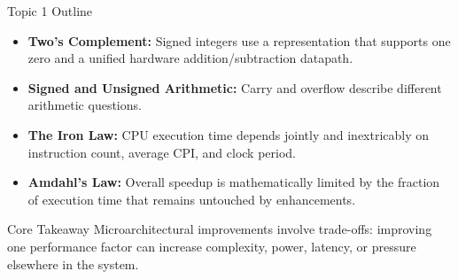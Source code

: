 \documentclass[aspectratio=169,11pt,t]{beamer}
\newcommand{\key}[1]{\textbf{#1}}
\begin{document}
\begin{frame}{Topic 1 Outline}

\begin{itemize}\setlength{\itemsep}{6pt}
  \item \key{Two's Complement:} Signed integers use a representation that supports one zero and a unified hardware addition/subtraction datapath.
  \item \key{Signed and Unsigned Arithmetic:} Carry and overflow describe different arithmetic questions.
  \item \key{The Iron Law:} CPU execution time depends jointly and inextricably on instruction count, average CPI, and clock period.
  \item \key{Amdahl's Law:} Overall speedup is mathematically limited by the fraction of execution time that remains untouched by enhancements.
\end{itemize}

\vfill
\begin{block}{Core Takeaway}
Microarchitectural improvements involve trade-offs: improving one performance factor can increase complexity, power, latency, or pressure elsewhere in the system.
\end{block}

\end{frame}





\end{document}
